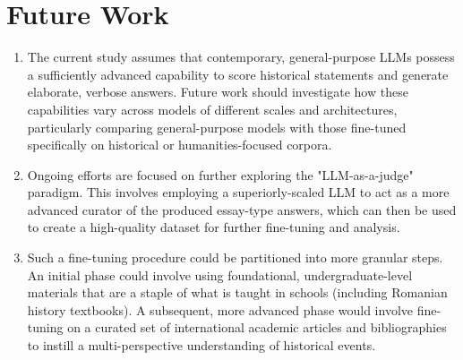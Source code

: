 \documentclass[11pt]{article}
\begin{document}
\section{Future Work}
\begin{enumerate}[label=\Alph*.]
    \item The current study assumes that contemporary, general-purpose LLMs possess a sufficiently advanced capability to score historical statements and generate elaborate, verbose answers. Future work should investigate how these capabilities vary across models of different scales and architectures, particularly comparing general-purpose models with those fine-tuned specifically on historical or humanities-focused corpora.
    \item Ongoing efforts are focused on further exploring the "LLM-as-a-judge" paradigm. This involves employing a superiorly-scaled LLM to act as a more advanced curator of the produced essay-type answers, which can then be used to create a high-quality dataset for further fine-tuning and analysis.
    \item Such a fine-tuning procedure could be partitioned into more granular steps. An initial phase could involve using foundational, undergraduate-level materials that are a staple of what is taught in schools (including Romanian history textbooks). A subsequent, more advanced phase would involve fine-tuning on a curated set of international academic articles and bibliographies to instill a multi-perspective understanding of historical events.
\end{enumerate}
\end{document}
